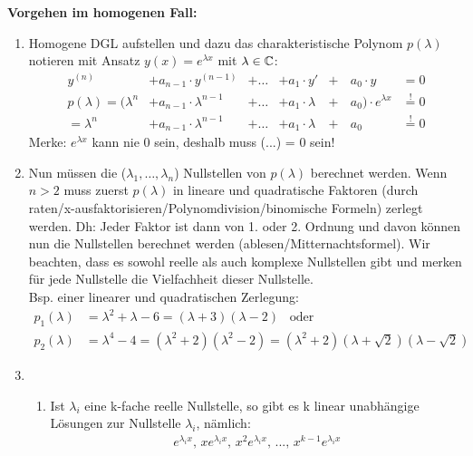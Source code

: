 \textbf{Vorgehen im homogenen Fall:}
\begin{enumerate}
	\item Homogene DGL aufstellen und dazu das charakteristische Polynom $p(\lambda)$ notieren mit Ansatz $y(x) = e^{\lambda x}$ mit $\lambda \in \mathbb{C}$:
	\begin{align*}
		y^{(n)} &+ a_{n-1} \cdot y^{(n-1)} &+ \ldots &+ a_1 \cdot y' &+& \, a_0 \cdot y&=0\\
		p(\lambda) = (\lambda^n &+ a_{n-1} \cdot \lambda^{n-1} &+ \ldots &+ a_1 \cdot \lambda &+& \, a_0) \cdot e^{\lambda x} &\overset{!}{=} 0 \\
		= \lambda^n &+ a_{n-1} \cdot \lambda^{n-1} &+ \ldots &+ a_1 \cdot \lambda &+& \, a_0 &\overset{!}{=} 0
	\end{align*}
	Merke: $e^{\lambda x}$ kann nie 0 sein, deshalb muss (...) = 0 sein!\\

	\item Nun müssen die ($\lambda_1, \ldots, \lambda_n$) Nullstellen von $p(\lambda)$ berechnet werden. Wenn $n > 2$ muss zuerst $p(\lambda)$ in lineare und quadratische Faktoren (durch raten/x-ausfaktorisieren/Polynomdivision/binomische Formeln) zerlegt werden. Dh: Jeder Faktor ist dann von 1. oder 2. Ordnung und davon können nun die Nullstellen berechnet werden (ablesen/Mitternachtsformel). Wir beachten, dass es sowohl reelle als auch komplexe Nullstellen gibt und merken für jede Nullstelle die Vielfachheit dieser Nullstelle.\\
	Bsp. einer linearer und quadratischen Zerlegung:
	{\small \begin{align*}
			p_1(\lambda) &= \lambda^2 + \lambda - 6 = (\lambda + 3) (\lambda - 2) \hspace{10pt} \text{oder} \\
			p_2(\lambda) &= \lambda^4 -4 = (\lambda^2 + 2) (\lambda^2 - 2) = (\lambda^2 + 2) (\lambda + \sqrt{2}) (\lambda - \sqrt{2})
	\end{align*}}
	\item 
	\begin{enumerate}[leftmargin=0.3cm]
		\item Ist $\lambda_i$ eine k-fache reelle Nullstelle, so gibt es k linear unabhängige Lösungen zur Nullstelle $\lambda_i$, nämlich:
		\vspace{3pt}
		\begin{align*}
			e^{\lambda_i x}, \, x e^{\lambda_i x}, \, x^2 e^{\lambda_i x}, \, ... , \, x^{k-1} e^{\lambda_i x}
		\end{align*}


\end{enumerate}
\end{enumerate}

